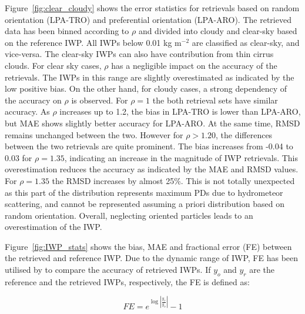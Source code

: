 \documentclass[amt, manuscript]{copernicus}
\begin{document}
Figure~\ref{fig:clear_cloudy} shows the error statistics for retrievals based on random orientation (LPA-TRO) and preferential orientation (LPA-ARO). The retrieved data has been binned according to $\rho$ and divided into cloudy and clear-sky based on the reference IWP.  All IWPs below 0.01\,\,kg m$^{-2}$ are classified as clear-sky, and vice-versa. The clear-sky IWPs can also have contribution from thin cirrus clouds. For clear sky cases, $\rho$ has a negligible impact on the accuracy of the retrievals. The IWPs in this range are slightly overestimated as indicated by the low positive bias. On the other hand, for cloudy cases, a strong dependency of the accuracy on $\rho$ is observed. For $\rho = 1$ the both retrieval sets have similar accuracy. As $\rho$ increases up to 1.2, the bias in LPA-TRO is lower than LPA-ARO, but MAE shows slightly better accuracy for LPA-ARO. At the same time, RMSD remains unchanged between the two. However for $\rho > 1.20$, the differences between the two retrievals are quite prominent. The bias increases from -0.04 to 0.03 for $\rho = 1.35$, indicating an increase in the magnitude of IWP retrievals. This overestimation reduces the accuracy as indicated by the MAE and RMSD values. For $\rho = 1.35$ the RMSD increases by almost 25\%. This is  not totally unexpected as this part of the distribution represents maximum PDs due to hydrometeor scattering, and cannot be represented assuming a priori distribution based on random orientation. Overall, neglecting oriented particles leads to an overestimation of the IWP. 


Figure~\ref{fig:IWP_stats} shows the bias, MAE and fractional error (FE) between the retrieved and reference IWP. Due to the dynamic range of IWP, FE has been utilised by \citet{holl:spare:14, brath:micro:20} to compare the accuracy of retrieved IWPs. If $y_o$ and $y_r$ are the reference and the retrieved IWPs, respectively, the FE is defined as:

\begin{equation}
FE = e^{\log\left|\frac{y_r}{y_o}\right|} - 1 
\end{equation}
\end{document}
